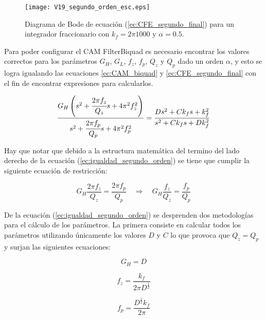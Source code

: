 	\begin{figure}[hbtp]
		\caption{Diagrama de Bode de ecuación (\ref{ec:CFE_segundo_final}) para un integrador fraccionario con $k_{f} = 2\pi 1000$ y  $\alpha = 0.5$.} 
		\label{fig:V19_segundo_orden_esc}
		\centering
		\texttt{[image: V19\_segundo\_orden\_esc.eps]}
	\end{figure}
	
	Para poder configurar el CAM FilterBiquad es necesario encontrar los valores correctos para los parámetros $G_{H}$, $G_{L}$, $f_{z}$, $f_{p}$, $Q_{z}$ y $Q_{p}$ dado un orden $\alpha$, y esto se logra igualando las ecuaciones \ref{ec:CAM_biquad} y \ref{ec:CFE_segundo_final} con el fin de encontrar expresiones para calcularlos.
	
	\begin{equation}
		\frac{G_{H} \left(  s^{2} + \cfrac{2 \pi f_{z}}{Q_{z}} s + 4 \pi^{2} f_{z}^{2} \right)}{s^{2} + \cfrac{2 \pi f_{p}}{Q_{p}}s + 4\pi^{2} f_{p}^{2} } = \frac{D s^{2} + C k_{f}s + k_{f}^{2}}{s^{2} + C k_{f}s + Dk_{f}^{2}}
		\label{ec:igualdad_segundo_orden}
	\end{equation}
		
	Hay que notar que debido a la estructura matemática del termino del lado derecho de la ecuación (\ref{ec:igualdad_segundo_orden}) se tiene que cumplir la siguiente ecuación de restricción:
		
	\begin{equation}
		G_{H} \frac{2 \pi f_{z}}{Q_{z}} = \frac{2 \pi f_{p}}{Q_{p}} \quad \Rightarrow \quad  G_{H} \frac{f_{z}}{Q_{z}} = \frac{f_{p}}{Q_{p}}
	\end{equation}
		
	De la ecuación (\ref{ec:igualdad_segundo_orden}) se desprenden dos metodologías para el cálculo de los parámetros. La primera consiste en calcular todos los parámetros utilizando únicamente los valores $D$ y $C$ lo que provoca que $Q_{z} = Q_{p}$ y surjan las siguientes ecuaciones:
		
	\begin{equation}
		G_{H} = D
	\end{equation}
	
	\begin{equation}
		f_{z} = \frac{k_{f}}{2 \pi D^{\frac{1}{2}}}
	\end{equation}
	
	\begin{equation}
		f_{p} = \frac{D^{\frac{1}{2}} k_{f}}{2 \pi}
	\end{equation}
	
